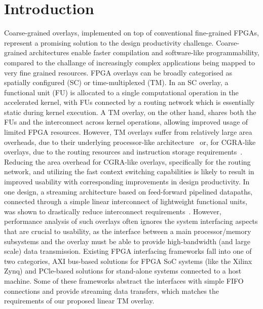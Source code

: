\section{Introduction}
Coarse-grained overlays, implemented on top of conventional fine-grained FPGAs, represent a promising solution to the design productivity challenge. 
Coarse-grained architectures enable faster compilation and software-like programmability, compared to the challange of increasingly complex applications being mapped to very fine grained resources.  
FPGA overlays can be broadly categorised as spatially configured (SC) or time-multiplexed (TM). 
In an SC overlay, a functional unit (FU) is allocated to a single computational operation in the accelerated kernel, with FUs connected by a routing network which is essentially static during kernel execution. 
A TM overlay, on the other hand, shares both the FUs and the interconnect across kernel operations, allowing improved usage of limited FPGA resources. 
However, TM overlays suffer from relatively large area overheads, due to their underlying processor-like architecture~\cite{severance2013embedded, rashid2014comparing, al2016fgpu, gray2016grvi, duarte2017scratch} or, for CGRA-like overlays, due to the routing resources and instruction storage requirements~\cite{paul2012remorph, liu2015quickdough}. 
Reducing the area overhead for CGRA-like overlays, specifically for the routing network, and utilizing the fast context switching capabilities is likely to result in improved usability with corresponding improvements in design productivity. 
In one design, a streaming architecture based on feed-forward pipelined datapaths, connected through a simple linear interconnect of lightweight functional units, was shown to drastically reduce interconnect requirements~\cite{li2018time}. 
However, performance analysis of such overlays often ignores the system interfacing aspects that are crucial to usability, as the interface between a main processor/memory subsystems and the overlay must be able to provide high-bandwidth (and large scale) data transmission.
Existing FPGA interfacing frameworks fall into one of two categories, AXI bus-based solutions for FPGA SoC systems (like the Xilinx Zynq) and PCle-based solutions for stand-alone systems connected to a host machine. 
Some of these frameworks abstract the interfaces with simple FIFO connections and provide streaming data transfers, which matches the requirements of our proposed linear TM overlay. 

